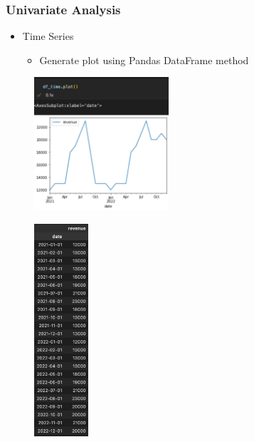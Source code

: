 \begin{frame}\frametitle{Univariate Analysis}
   \begin{minipage}{0.58\linewidth}
      \begin{itemize}
         \item Time Series
         \begin{itemize}
            \item Generate plot using Pandas DataFrame method
         \end{itemize}
      \end{itemize}
      \vspace{.5cm}
      \begin{figure}[H]
         \includegraphics[width=5cm]{../images/illustrations/pattern_graph_time_series_creation.png}
      \end{figure}
   \end{minipage}
   \begin{minipage}{0.38\linewidth}
      \begin{figure}[H]
         \includegraphics[width=2cm]{../images/illustrations/pattern_df_time_series.png}
      \end{figure}
   \end{minipage}
\end{frame}


